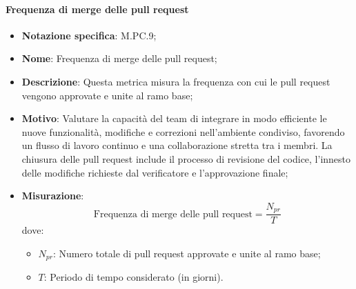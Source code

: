 \paragraph*{Frequenza di merge delle pull request}
\begin{itemize}
    \item \textbf{Notazione specifica}: M.PC.9;
    \item \textbf{Nome}: Frequenza di merge delle pull request;
    \item \textbf{Descrizione}: Questa metrica misura la frequenza con cui le pull request vengono approvate e unite al ramo base;
    \item \textbf{Motivo}: Valutare la capacità del team di integrare in modo efficiente le nuove funzionalità, modifiche e correzioni nell’ambiente condiviso, favorendo un flusso di lavoro continuo e una collaborazione  stretta tra i membri. La chiusura delle pull request include il processo di revisione del codice, l’innesto delle modifiche richieste dal verificatore e l’approvazione finale;
    \item \textbf{Misurazione}:
    \[
        \text{Frequenza di merge delle pull request} = \frac{N_{pr}}{T} 
    \]
    dove:
    \begin{itemize}
        \item $N_{pr}$: Numero totale di pull request approvate e unite al ramo base;
        \item $T$: Periodo di tempo considerato (in giorni).
    \end{itemize}
\end{itemize}
